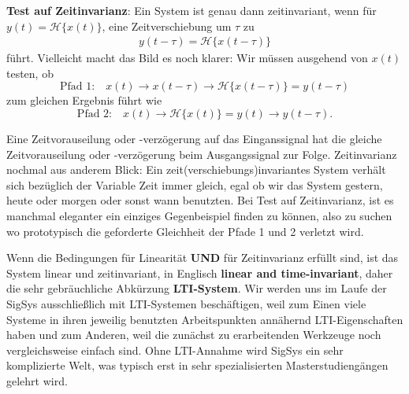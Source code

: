 \documentclass[11pt,a4paper,DIV=12]{scrartcl}
\numberwithin{equation}{section}
\numberwithin{figure}{section}
\newcommand{\sysH}[1]{\mathcal{H}{\{#1\}}}
\begin{document}
\begin{Werkzeug}
\textbf{Test auf Zeitinvarianz}:
Ein System ist genau dann zeitinvariant, wenn für $y(t) = \sysH{x(t)}$,
eine Zeitverschiebung um $\tau$ zu
\begin{align}
y(t-\tau) = \sysH{x(t-\tau)}
\end{align}
führt.
Vielleicht macht das Bild es noch klarer:
Wir müssen ausgehend von $x(t)$ testen, ob
\begin{equation}
\text{Pfad 1:} \quad x(t)\rightarrow x(t-\tau)\rightarrow \mathcal{H}\{x(t-\tau)\}=y(t-\tau)
\end{equation}
zum gleichen Ergebnis führt wie
\begin{equation}
\text{Pfad 2:} \quad x(t)\rightarrow \mathcal{H}\{x(t)\}=y(t)\rightarrow y(t-\tau).
\end{equation}
%
\begin{center}
\end{center}
%
Eine Zeitvorauseilung oder -verzögerung auf das Einganssignal hat die gleiche
Zeitvorauseilung oder -verzögerung beim Ausgangssignal zur Folge.
%
Zeitinvarianz nochmal aus anderem Blick:
Ein zeit(verschiebungs)invariantes System verhält sich bezüglich
der Variable Zeit immer gleich, egal ob wir das System gestern, heute oder
morgen oder sonst wann benutzten.
%
Bei Test auf Zeitinvarianz, ist es manchmal eleganter ein einziges Gegenbeispiel
finden zu können, also zu suchen wo prototypisch die geforderte Gleichheit der
Pfade 1 und 2 verletzt wird.

Wenn die Bedingungen für Linearität \textbf{UND} für Zeitinvarianz erfüllt sind, ist das
System linear und zeitinvariant, in Englisch \textbf{linear and time-invariant}, daher die
sehr gebräuchliche Abkürzung \textbf{LTI-System}. Wir werden uns im Laufe der SigSys ausschließlich
mit LTI-Systemen beschäftigen, weil zum Einen viele Systeme in ihren jeweilig
benutzten Arbeitspunkten annähernd LTI-Eigenschaften haben und zum Anderen, weil die
zunächst zu erarbeitenden Werkzeuge noch vergleichsweise einfach sind.
Ohne LTI-Annahme wird SigSys ein sehr komplizierte Welt, was typisch erst in
sehr spezialisierten Masterstudiengängen gelehrt wird.
\end{Werkzeug}
\end{document}
